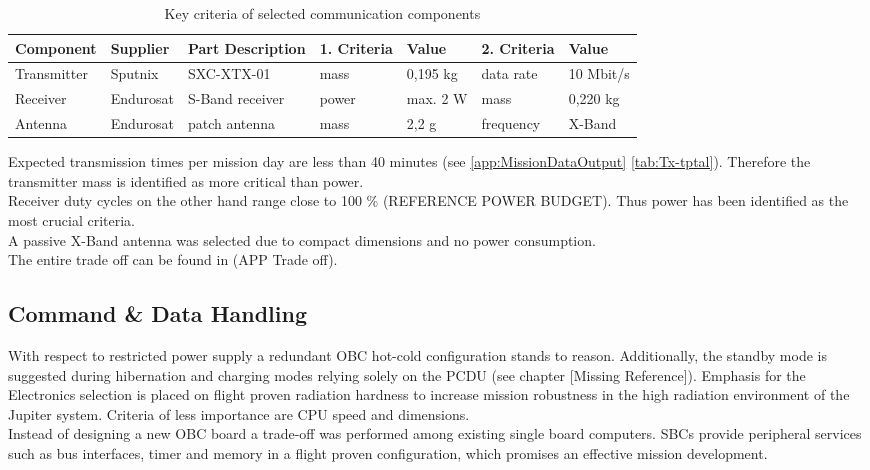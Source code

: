 \begin{table}[h]
\centering
\caption{Key criteria of selected communication components}
\begin{tabular}{lll|ll|ll}
Component   & Supplier  & Part Description     & 1. Criteria   & Value    & 2. Criteria & Value          \\ \hline\hline
Transmitter & Sputnix   & SXC-XTX-01           & mass          & 0,195 kg & data rate   & 10 Mbit/s \\
Receiver    & Endurosat & S-Band receiver      & power         & max. 2 W & mass        & 0,220 kg       \\
Antenna     & Endurosat & patch antenna & mass          & 2,2 g    & frequency   & X-Band         \\ \hline
\end{tabular}
\label{tab:ComCompComp}
\end{table}

Expected transmission times per mission day are less than 40 minutes (see \autoref{app:MissionDataOutput} \autoref{tab:Tx-tptal}). Therefore the transmitter mass is identified as more critical than power. \\
Receiver duty cycles on the other hand range close to 100 \% (REFERENCE POWER BUDGET). Thus power has been identified as the most crucial criteria. \\
A passive X-Band antenna was selected due to compact dimensions and no power consumption.  \\
The entire trade off can be found in (APP Trade off).

 \subsection{Command \& Data Handling}
 
 With respect to restricted power supply a redundant OBC hot-cold configuration stands to reason. Additionally, the standby mode is suggested during hibernation and charging modes relying solely on the PCDU (see chapter [Missing Reference]). 
Emphasis for the Electronics selection is placed on flight proven radiation hardness to increase mission robustness in the high radiation environment of the Jupiter system. 
Criteria of less importance are CPU speed and dimensions. \\

Instead of designing a new OBC board a trade-off was performed among existing single board computers. SBCs provide peripheral services such as bus interfaces, timer and memory in a flight proven configuration, which promises an effective mission development. \\


